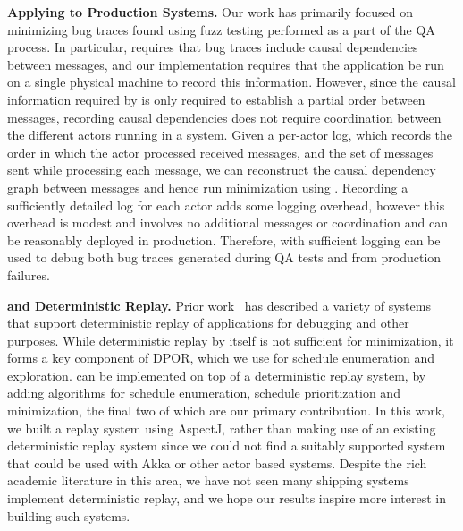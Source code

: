 \noindent\textbf{Applying \sys to Production Systems.} Our work has primarily focused on minimizing bug traces found using fuzz testing performed as a part of the QA process. In particular, \sys requires that bug traces include causal dependencies between messages, and our implementation requires that the application be run on a single physical machine to record this information. However, since the causal information required by \sys is only required to establish a partial order between messages, recording causal dependencies does not require coordination between the different actors running in a system. Given a per-actor log, which records the order in which the actor processed received messages, and the set of messages sent while processing each message, we can reconstruct the causal dependency graph between messages and hence run minimization using \sys. Recording a sufficiently detailed log for each actor adds some logging overhead, however this overhead is modest and involves no additional messages or coordination and can be reasonably deployed in production. Therefore, with sufficient logging \sys can be used to debug both bug traces generated during QA tests and from production failures.

\noindent\textbf{\sys and Deterministic Replay.} Prior work~\cite{} has described a variety of systems that support deterministic replay of applications for debugging and other purposes. While deterministic replay by itself is not sufficient for minimization, it forms a key component of DPOR, which we use for schedule enumeration and exploration. \sys can be implemented on top of a deterministic replay system, by adding algorithms for schedule enumeration, schedule prioritization and minimization, the final two of which are our primary contribution. In this work, we built a replay system using AspectJ, rather than making use of an existing deterministic replay system since we could not find a suitably supported system that could be used with Akka or other actor based systems. Despite the rich academic literature in this area, we have not seen many shipping systems implement deterministic replay, and we hope our results inspire more interest in building such systems.